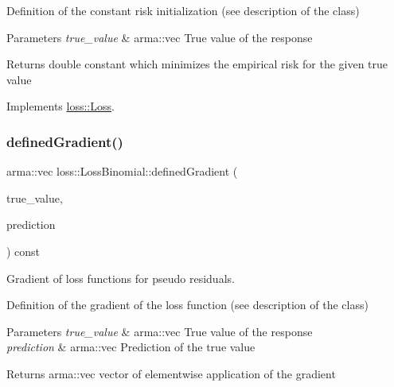 Definition of the constant risk initialization (see description of the class)


\begin{DoxyParams}{Parameters}
{\em true\+\_\+value} & {\ttfamily arma\+::vec} True value of the response\\
\hline
\end{DoxyParams}
\begin{DoxyReturn}{Returns}
{\ttfamily double} constant which minimizes the empirical risk for the given true value 
\end{DoxyReturn}


Implements \hyperlink{classloss_1_1_loss_a65fe7dcd9370e6a549b8d1cc95fc8798}{loss\+::\+Loss}.

\mbox{\label{classloss_1_1_loss_binomial_a68dcf02e90d09c3658733a9319a85f56}} 
\subsubsection{\texorpdfstring{defined\+Gradient()}{definedGradient()}}
{\footnotesize\ttfamily arma\+::vec loss\+::\+Loss\+Binomial\+::defined\+Gradient (\begin{DoxyParamCaption}\item[{const arma\+::vec \&}]{true\+\_\+value,  }\item[{const arma\+::vec \&}]{prediction }\end{DoxyParamCaption}) const\hspace{0.3cm}{\ttfamily [virtual]}}



Gradient of loss functions for pseudo residuals. 

Definition of the gradient of the loss function (see description of the class)


\begin{DoxyParams}{Parameters}
{\em true\+\_\+value} & {\ttfamily arma\+::vec} True value of the response \\
\hline
{\em prediction} & {\ttfamily arma\+::vec} Prediction of the true value\\
\hline
\end{DoxyParams}
\begin{DoxyReturn}{Returns}
{\ttfamily arma\+::vec} vector of elementwise application of the gradient 
\end{DoxyReturn}


